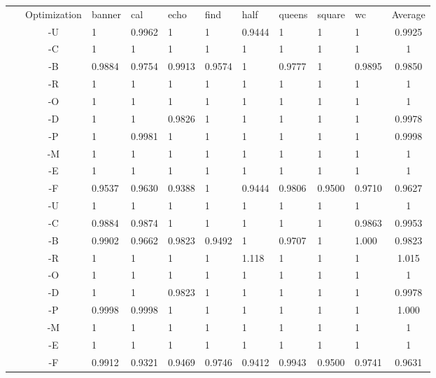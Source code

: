 \documentclass[10pt]{article}
\theoremstyle{remark}
\begin{document}
	\begin{tabular}{cc||l|l|l|l|l|l|l|l||c}
		~ & Optimization & banner & cal & echo & find & half & queens & square & wc & Average \\ \hhline{~==========}
		\multirow{10}{*}{\rotatebox[origin=c]{90}{\parbox[c]{4cm}{\centering \large Static Instructions }}} & -U & 1 & 0.9962 & 1 & 1 & 0.9444 & 1 & 1 & 1 & 0.9925 \\ \cline{2-11}
		~ & -C & 1 & 1 & 1 & 1 & 1 & 1 & 1 & 1 & 1 \\ \cline{2-11}
		~ & -B & 0.9884 & 0.9754 & 0.9913 & 0.9574 & 1 & 0.9777 & 1 & 0.9895 & 0.9850 \\ \cline{2-11}
		~ & -R & 1 & 1 & 1 & 1 & 1 & 1 & 1 & 1 & 1 \\ \cline{2-11}
		~ & -O & 1 & 1 & 1 & 1 & 1 & 1 & 1 & 1 & 1 \\ \cline{2-11}
		~ & -D & 1 & 1 & 0.9826 & 1 & 1 & 1 & 1 & 1 & 0.9978 \\ \cline{2-11}
		~ & -P & 1 & 0.9981 & 1 & 1 & 1 & 1 & 1 & 1 & 0.9998 \\ \cline{2-11}
		~ & -M & 1 & 1 & 1 & 1 & 1 & 1 & 1 & 1 & 1 \\ \cline{2-11}
		~ & -E & 1 & 1 & 1 & 1 & 1 & 1 & 1 & 1 & 1 \\ \cline{2-11}
		~ & -F & 0.9537 & 0.9630 & 0.9388 & 1 & 0.9444 & 0.9806 & 0.9500 & 0.9710 & 0.9627 \\ \hline \hline
		\multirow{10}{*}{\rotatebox[origin=c]{90}{\parbox[c]{4cm}{\centering \large Dynamic Instructions }}} & -U & 1 & 1 & 1 & 1 & 1 & 1 & 1 & 1 & 1 \\ \cline{2-11}
		~ & -C & 0.9884 & 0.9874 & 1 & 1 & 1 & 1 & 1 & 0.9863 & 0.9953 \\ \cline{2-11}
		~ & -B & 0.9902 & 0.9662 & 0.9823 & 0.9492 & 1 & 0.9707 & 1 & 1.000 & 0.9823 \\ \cline{2-11}
		~ & -R & 1 & 1 & 1 & 1 & 1.118 & 1 & 1 & 1 & 1.015 \\ \cline{2-11}
		~ & -O & 1 & 1 & 1 & 1 & 1 & 1 & 1 & 1 & 1 \\ \cline{2-11}
		~ & -D & 1 & 1 & 0.9823 & 1 & 1 & 1 & 1 & 1 & 0.9978 \\ \cline{2-11}
		~ & -P & 0.9998 & 0.9998 & 1 & 1 & 1 & 1 & 1 & 1 & 1.000 \\ \cline{2-11}
		~ & -M & 1 & 1 & 1 & 1 & 1 & 1 & 1 & 1 & 1 \\ \cline{2-11}
		~ & -E & 1 & 1 & 1 & 1 & 1 & 1 & 1 & 1 & 1 \\ \cline{2-11}
		~ & -F & 0.9912 & 0.9321 & 0.9469 & 0.9746 & 0.9412 & 0.9943 & 0.9500 & 0.9741 & 0.9631 \\ \hline \hline

\end{tabular}
\end{document}
